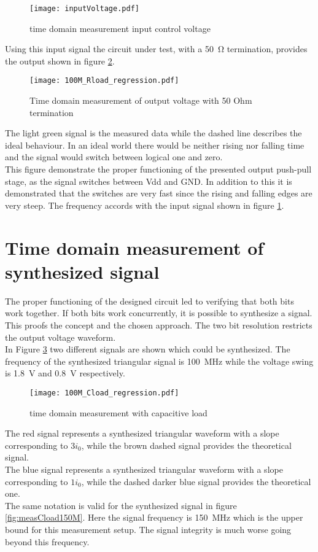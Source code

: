 \begin{figure}[htb!]
	\centering
  \texttt{[image: inputVoltage.pdf]}
	\caption{time domain measurement input control voltage}
	\label{fig:inputMeas}
\end{figure}


Using this input signal the circuit under test, with a \SI{50}{\ohm} termination, provides the output shown in figure \ref{fig:measRload100M}.

\begin{figure}[htb!]
	\centering
  \texttt{[image: 100M\_Rload\_regression.pdf]}
	\caption{Time domain measurement of output voltage with 50 Ohm termination}
	\label{fig:measRload100M}
\end{figure}

The light green signal is the measured data while the dashed line describes the ideal behaviour.
In an ideal world there would be neither rising nor falling time and the signal would switch between logical one and zero.\\
This figure demonstrate the proper functioning of the presented output push-pull stage, as the signal switches between Vdd and GND.
In addition to this it is demonstrated that the switches are very fast since the rising and falling edges are very steep.
The frequency accords with the input signal shown in figure \ref{fig:inputMeas}.


\section{Time domain measurement of synthesized signal}
The proper functioning of the designed circuit led to verifying that both bits work together.
If both bits work concurrently, it is possible to synthesize a signal.
This proofs the concept and the chosen approach.
The two bit resolution restricts the output voltage waveform.\\
In Figure \ref{fig:measCload100M} two different signals are shown which could be synthesized. 
The frequency of the synthesized triangular signal is \SI{100}{\mega \hertz} while the voltage swing is \SI{1.8}{\volt} and \SI{0.8}{\volt} respectively.

\begin{figure}[htb!]
	\centering
  \texttt{[image: 100M\_Cload\_regression.pdf]}
	\caption{time domain measurement with capacitive load}
	\label{fig:measCload100M}
\end{figure}

The red signal represents a synthesized triangular waveform with a slope corresponding to $3 i_0$, while the brown dashed signal provides the theoretical signal.\\
The blue signal represents a synthesized triangular waveform with a slope corresponding to $1 i_0$, while the dashed darker blue signal provides the theoretical one.\\
The same notation is valid for the synthesized signal in figure \ref{fig:measCload150M}.
Here the signal frequency is \SI{150}{\mega \hertz} which is the upper bound for this measurement setup.
The signal integrity is much worse going beyond this frequency.

